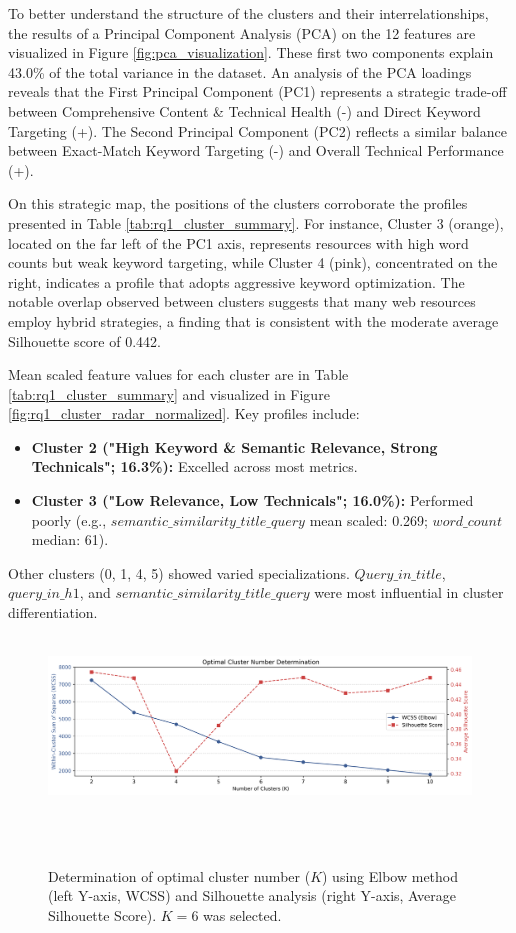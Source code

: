 \documentclass[a4paper,fleqn]{cas-sc}
\begin{document}
To better understand the structure of the clusters and their interrelationships, the results of a Principal Component Analysis (PCA) on the 12 features are visualized in Figure \ref{fig:pca_visualization}. These first two components explain 43.0\% of the total variance in the dataset. An analysis of the PCA loadings reveals that the First Principal Component (PC1) represents a strategic trade-off between Comprehensive Content \& Technical Health (-) and Direct Keyword Targeting (+). The Second Principal Component (PC2) reflects a similar balance between Exact-Match Keyword Targeting (-) and Overall Technical Performance (+).

On this strategic map, the positions of the clusters corroborate the profiles presented in Table \ref{tab:rq1_cluster_summary}. For instance, Cluster 3 (orange), located on the far left of the PC1 axis, represents resources with high word counts but weak keyword targeting, while Cluster 4 (pink), concentrated on the right, indicates a profile that adopts aggressive keyword optimization. The notable overlap observed between clusters suggests that many web resources employ hybrid strategies, a finding that is consistent with the moderate average Silhouette score of 0.442.


Mean scaled feature values for each cluster are in Table \ref{tab:rq1_cluster_summary} and visualized in Figure \ref{fig:rq1_cluster_radar_normalized}.
Key profiles include:
\begin{itemize}
    \item \textbf{Cluster 2 ("High Keyword \& Semantic Relevance, Strong Technicals"; 16.3\%):} Excelled across most metrics.
    \item \textbf{Cluster 3 ("Low Relevance, Low Technicals"; 16.0\%):} Performed poorly (e.g., $semantic\_similarity\_title\_query$ mean scaled: \num{0.269}; $word\_count$ median: \num{61}).
\end{itemize}
Other clusters (0, 1, 4, 5) showed varied specializations. $Query\_in\_title$, $query\_in\_h1$, and $semantic\_similarity\_title\_query$ were most influential in cluster differentiation.

\begin{figure}[htbp!]
    \centering
    \includegraphics[width=1\linewidth]{figs/rq1_optimal_clusters_combined.png}
    \caption{Determination of optimal cluster number ($K$) using Elbow method (left Y-axis, WCSS) and Silhouette analysis (right Y-axis, Average Silhouette Score). $K=6$ was selected.}
    \label{fig:rq1_optimal_clusters}
\end{figure}
\end{document}

